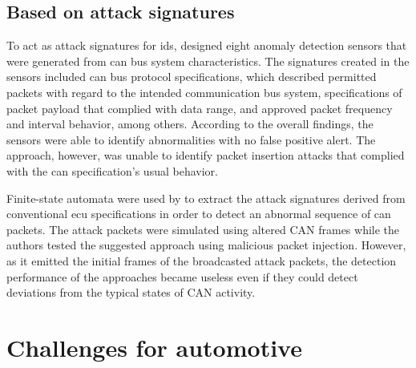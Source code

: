 \subsection{Based on attack signatures}

To act as attack signatures for \gls{ids}, \cite{muter2010} designed eight anomaly detection sensors that were generated from \gls{can} bus system characteristics. The signatures created in the sensors included \gls{can} bus protocol specifications, which described permitted packets with regard to the intended communication bus system, specifications of packet payload that complied with data range, and approved packet frequency and interval behavior, among others. According to the overall findings, the sensors were able to identify abnormalities with no false positive alert. The approach, however, was unable to identify packet insertion attacks that complied with the \gls{can} specification's usual behavior.\par
Finite-state automata were used by \cite{studnia2018} to extract the attack signatures derived from conventional \gls{ecu} specifications in order to detect an abnormal sequence of \gls{can} packets. The attack packets were simulated using altered CAN frames while the authors tested the suggested approach using malicious packet injection. However, as it emitted the initial frames of the broadcasted attack packets, the detection performance of the approaches became useless even if they could detect deviations from the typical states of CAN activity.

\section{Challenges for automotive}

